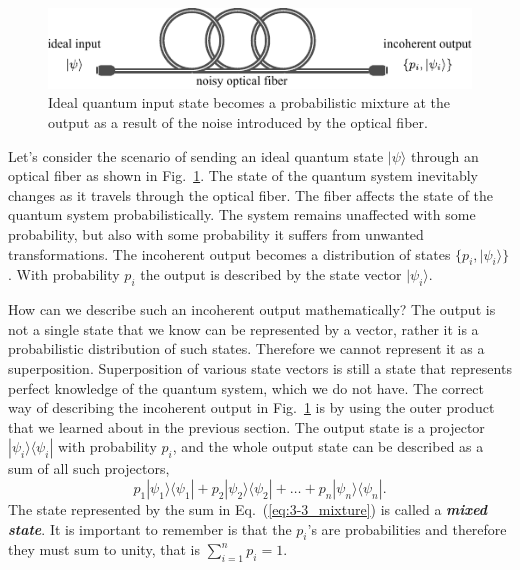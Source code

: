 \begin{figure}[t]
    \centering
    \includegraphics[width=\textwidth]{lesson3/3-3_noisy_communication.pdf}
    \caption[Noisy quantum communication]{Ideal quantum input state becomes a probabilistic mixture at the output as a result of the noise introduced by the optical fiber.}
    \label{fig:3-3_noisy_communication}
\end{figure}

Let's consider the scenario of sending an ideal quantum state $|\psi\rangle$ through an optical fiber as shown in Fig.~\ref{fig:3-3_noisy_communication}.
The state of the quantum system inevitably changes as it travels through the optical fiber.
The fiber affects the state of the quantum system probabilistically.
The system remains unaffected with some probability, but also with some probability it suffers from unwanted transformations.
The incoherent output becomes a distribution of states $\{p_i, |\psi_i\rangle\}$.
With probability $p_i$ the output is described by the state vector $|\psi_i\rangle$.

How can we describe such an incoherent output mathematically?
The output is not a single state that we know can be represented by a vector, rather it is a probabilistic distribution of such states.
Therefore we cannot represent it as a superposition.
Superposition of various state vectors is still a state that represents perfect knowledge of the quantum system, which we do not have.
The correct way of describing the incoherent output in Fig.~\ref{fig:3-3_noisy_communication} is by using the outer product that we learned about in the previous section.
The output state is a projector $|\psi_i\rangle\langle\psi_i|$ with probability $p_i$, and the whole output state can be described as a sum of all such projectors,
\begin{equation}
    p_1 |\psi_1\rangle\langle\psi_1| + p_2 |\psi_2\rangle\langle\psi_2| + \ldots + p_n |\psi_n\rangle\langle\psi_n|.
    \label{eq:3-3_mixture}
\end{equation}
The state represented by the sum in Eq.~(\ref{eq:3-3_mixture}) is called a \textit{\textbf{mixed state}}.
It is important to remember is that the $p_i$'s are probabilities and therefore they must sum to unity, that is $\sum_{i=1}^n p_i=1$.

